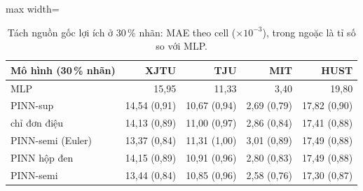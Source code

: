 \documentclass[12pt,a4paper,oneside]{report}
\theoremstyle{plain}
\theoremstyle{definition}
\begin{document}
\begin{table}[!htbp]\centering\small
\caption[Tách nguồn gốc lợi ích ở 30\,\% nhãn]{Tách nguồn gốc lợi ích ở 30\,\% nhãn: MAE theo cell (×$10^{-3}$), trong ngoặc là tỉ số so với MLP.}\label{tab:source}
\begin{adjustbox}{max width=\textwidth}\begin{tabular}{lrrrr}\toprule
Mô hình (30\,\% nhãn) & XJTU & TJU & MIT & HUST \\\midrule
MLP & 15{,}95 & 11{,}33 & 3{,}40 & 19{,}80 \\
PINN-sup & 14{,}54 (0{,}91) & 10{,}67 (0{,}94) & 2{,}69 (0{,}79) & 17{,}82 (0{,}90) \\
chỉ đơn điệu & 14{,}13 (0{,}89) & 11{,}00 (0{,}97) & 2{,}86 (0{,}84) & 17{,}41 (0{,}88) \\
PINN-semi (Euler) & 13{,}37 (0{,}84) & 11{,}31 (1{,}00) & 3{,}01 (0{,}89) & 17{,}49 (0{,}88) \\
PINN hộp đen & 14{,}15 (0{,}89) & 10{,}91 (0{,}96) & 2{,}80 (0{,}83) & 17{,}49 (0{,}88) \\
PINN-semi & 13{,}44 (0{,}84) & 10{,}85 (0{,}96) & 2{,}58 (0{,}76) & 17{,}30 (0{,}87) \\
\bottomrule\end{tabular}\end{adjustbox}\end{table}
\end{document}
